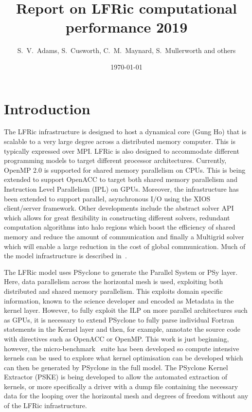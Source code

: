 \documentclass[11pt]{article}
\author{S.~V.~Adams, S.~Cusworth, C.~M.~Maynard, S.~Mullerworth and others}
\title{Report on LFRic computational performance 2019}
\date{\today}
\begin{document}
\maketitle
\medskip
\section{Introduction\label{sec:intro}}
The LFRic infrastructure is designed to host a dynamical core (Gung Ho)
that is scalable to a very large degree across a distributed memory
computer. This is typically expressed over MPI. LFRic is also designed
to accommodate different programming models to target different
processor architectures. Currently, OpenMP 2.0 is supported for shared
memory parallelism on CPUs. This is being extended to support OpenACC
to target both shared memory parallelism and Instruction Level
Parallelism (IPL) on GPUs. Moreover, the infrastructure has been
extended to support parallel, asynchronous I/O using the XIOS
client/server framework.
Other developments include the abstract solver API which allows for great
flexibility in constructing different solvers, redundant computation
algorithms into halo regions which boost the efficiency of shared
memory and reduce the amount of communication and finally a Multigrid
solver which will enable a large reduction in the cost of global communication.
Much of the model infrastructure is described in~\cite{LFRic}.

The LFRic model uses PSyclone to generate the Parallel System or PSy
layer. Here, data parallelism across the horizontal mesh is used,
exploiting both distributed and shared memory parallelism. This
exploits domain specific information, known to the science developer
and encoded as Metadata in the kernel layer. However, to
fully exploit the ILP on more parallel architectures such as GPUs, it
is necessary to extend PSyclone to fully parse individual Fortran
statements in the Kernel layer and then, for example, annotate the
source code with directives such as OpenACC or OpenMP. This work is just beginning,
however, the micro-benchmark~\cite{lfric-microbenchmarks} suite has been
developed so compute intensive kernels can be used to explore what kernel
optimisation can be developed which can then be generated by PSyclone in the full
model. The PSyclone Kernel Extractor (PSKE) is being developed to
allow the automated extraction of kernels, or more specifically a
driver with a dump file containing the necessary data for the looping
over the horizontal mesh and degrees of freedom without any of the
LFRic infrastructure.
\end{document}
